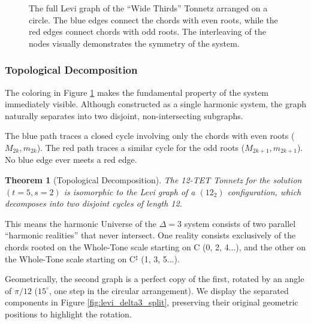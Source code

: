 \documentclass[12pt,letterpaper]{amsart}
\newtheorem{theorem}{Theorem}
\begin{document}
\begin{figure}[H]
\begin{tikzpicture}[scale=0.6, transform shape]
\end{tikzpicture}
\caption{The full Levi graph of the ``Wide Thirds'' Tonnetz arranged on a circle. The blue edges connect the chords with even roots, while the red edges connect chords with odd roots. The interleaving of the nodes visually demonstrates the symmetry of the system.}
\label{fig:levi_delta3_full}
\end{figure}

\subsubsection{Topological Decomposition}

The coloring in Figure \ref{fig:levi_delta3_full} makes the fundamental property of the system immediately visible. Although constructed as a single harmonic system, the graph naturally separates into two disjoint, non-intersecting subgraphs.

The blue path traces a closed cycle involving only the chords with even roots ($M_{2k}, m_{2k}$). The red path traces a similar cycle for the odd roots ($M_{2k+1}, m_{2k+1}$). No blue edge ever meets a red edge.

\begin{theorem}[Topological Decomposition]
The 12-TET Tonnetz for the solution $(t=5, s=2)$ is isomorphic to the Levi graph of a $(12_2)$ configuration, which decomposes into two disjoint cycles of length 12.
\end{theorem}

This means the harmonic Universe of the $\Delta=3$ system consists of two parallel ``harmonic realities'' that never intersect. One reality consists exclusively of the chords rooted on the Whole-Tone scale starting on C (0, 2, 4...), and the other on the Whole-Tone scale starting on C$^\sharp$ (1, 3, 5...).

Geometrically, the second graph is a perfect copy of the first, rotated by an angle of $\pi/12$ ($15^\circ$, one step in the circular arrangement). We display the separated components in Figure \ref{fig:levi_delta3_split}, preserving their original geometric positions to highlight the rotation.
\end{document}
